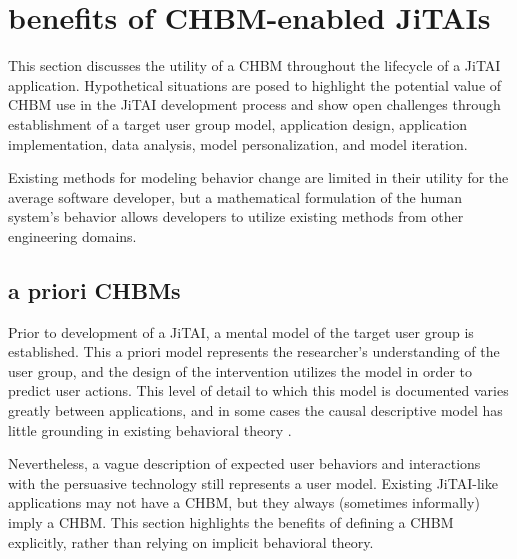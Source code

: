 \documentclass[runningheads,a4paper]{llncs}
\begin{document}

\section{benefits of CHBM-enabled JiTAIs}
This section discusses the utility of a CHBM throughout the lifecycle of a JiTAI application.
Hypothetical situations are posed to highlight the potential value of CHBM use in the JiTAI development process and show open challenges through establishment of a target user group model, application design, application implementation, data analysis, model personalization, and model iteration.

Existing methods for modeling behavior change are limited in their utility for the average software developer, but a mathematical formulation of the human system's behavior allows developers to utilize existing methods from other engineering domains.

\subsection{a priori CHBMs}
Prior to development of a JiTAI, a mental model of the target user group is established.
This a priori model represents the researcher's understanding of the user group, and the design of the intervention utilizes the model in order to predict user actions.
This level of detail to which this model is documented varies greatly between applications, and in some cases the causal descriptive model has little grounding in existing behavioral theory \cite{prestwich2014does}.


Nevertheless, a vague description of expected user behaviors and interactions with the persuasive technology still represents a user model.
Existing JiTAI-like applications may not have a CHBM, but they always (sometimes informally) imply a CHBM.
This section highlights the benefits of defining a CHBM explicitly, rather than relying on implicit behavioral theory.
\end{document}
